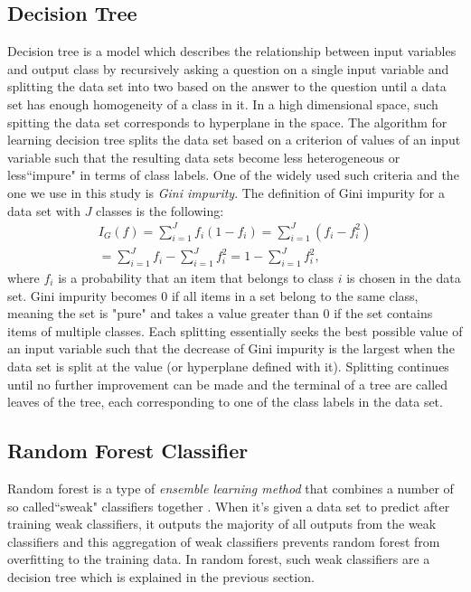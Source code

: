 		\subsection{Decision Tree}
		Decision tree is a model which describes the relationship between input variables and output class by recursively asking a question on a single input variable and splitting the data set into two based on the answer to the question until a data set has enough homogeneity of a class in it. In a high dimensional space, such spitting the data set corresponds to hyperplane in the space. The algorithm for learning decision tree splits the data set based on a criterion of values of an input variable such that the resulting data sets become less heterogeneous or less``impure" in terms of class labels. One of the widely used such criteria and the one we use in this study is \textit{Gini impurity}. The definition of Gini impurity for a data set with $J$ classes is the following:
	\begin{equation}
		\begin{split}
	I_G(f) = \sum_{i=1}^J f_i(1-f_i) = \sum_{i=1}^J (f_i-f_i^2) \\
	  = \sum_{i=1}^J f_i - \sum_{i=1}^J f_i^2 = 1- \sum_{i=1}^J f_i^2,
		\end{split}
	\end{equation}
where $f_i$ is a probability that an item that belongs to class $i$ is chosen in the data set. Gini impurity becomes $0$ if all items in a set belong to the same class, meaning the set is "pure" and takes a value greater than $0$ if the set contains items of multiple classes. Each splitting essentially seeks the best possible value of an input variable such that the decrease of Gini impurity is the largest when the data set is split at the value (or hyperplane defined with it). Splitting continues until no further improvement can be made and the terminal of a tree are called leaves of the tree, each corresponding to one of the class labels in the data set.
		
	
		\subsection{Random Forest Classifier}
Random forest is a type of \textit{ensemble learning method} that combines a number of so called``sweak" classifiers together \cite{RandomForest}. When it's given a data set to predict after training weak classifiers, it outputs the majority of all outputs from the weak classifiers and this aggregation of weak classifiers prevents random forest from overfitting to the training data. In random forest, such weak classifiers are a decision tree which is explained in the previous section.

